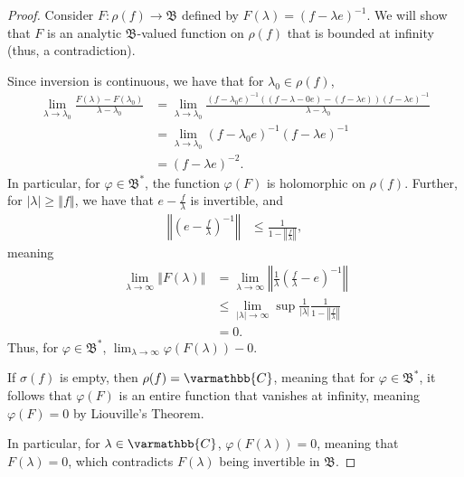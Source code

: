 \documentclass[10pt]{extarticle}
\newcommand{\C}{\mathbb{C}}
\newcommand{\norm}[1]{\left\Vert #1\right\Vert}
\theoremstyle{plain}
\theoremstyle{definition}
\theoremstyle{note}
\renewcommand*{\mathbb}[1]{\varmathbb{#1}}
\renewcommand{\newline}{\hfill\break}
\begin{document}
\begin{proof}
  Consider $F: \rho(f) \rightarrow \mathfrak{B}$ defined by $F(\lambda) = \left(f - \lambda e\right)^{-1}$. We will show that $F$ is an analytic $\mathfrak{B}$-valued function on $\rho(f)$ that is bounded at infinity (thus, a contradiction).\newline

  Since inversion is continuous, we have that for $\lambda_0 \in \rho(f)$,
  \begin{align*}
    \lim_{\lambda \rightarrow \lambda_0} \frac{F(\lambda) - F(\lambda_0)}{\lambda - \lambda_0} &= \lim_{\lambda \rightarrow \lambda_0}\frac{\left(f - \lambda_0 e\right)^{-1}\left((f - \lambda-0 e) - (f - \lambda e)\right)\left(f - \lambda e\right)^{-1}}{\lambda - \lambda_0}\\
                                                                                               &= \lim_{\lambda \rightarrow \lambda_0}\left(f - \lambda_0 e\right)^{-1}\left(f - \lambda e\right)^{-1}\\
                                 &= \left(f - \lambda e\right)^{-2}.
  \end{align*}
  In particular, for $\varphi \in \mathfrak{B}^{\ast}$, the function $\varphi(F)$ is holomorphic on $\rho(f)$. Further, for $|\lambda| \geq \norm{f}$, we have that $e - \frac{f}{\lambda}$ is invertible, and
  \begin{align*}
    \norm{\left(e - \frac{f}{\lambda}\right)^{-1}} &\leq \frac{1}{1 - \norm{\frac{f}{\lambda}}},
  \end{align*}
  meaning
  \begin{align*}
    \lim_{\lambda \rightarrow\infty}\norm{F(\lambda)} &= \lim_{\lambda \rightarrow\infty}\norm{\frac{1}{\lambda}\left(\frac{f}{\lambda} - e\right)^{-1}}\\
                                                      &\leq \lim_{|\lambda|\rightarrow\infty}\sup\frac{1}{|\lambda|} \frac{1}{1-\norm{\frac{f}{\lambda}}}\\
                                                      &= 0.
  \end{align*}
  Thus, for $\varphi \in \mathfrak{B}^{\ast}$, $\lim_{\lambda \rightarrow\infty}\varphi\left(F(\lambda)\right) - 0$.\newline

  If $\sigma(f)$ is empty, then $\rho(f) = \C$, meaning that for $\varphi \in \mathfrak{B}^{\ast}$, it follows that $\varphi(F)$ is an entire function that vanishes at infinity, meaning $\varphi(F) = 0$ by Liouville's Theorem.\newline

  In particular, for $\lambda \in \C$, $\varphi\left(F(\lambda)\right) = 0$, meaning that $F(\lambda) = 0$, which contradicts $F(\lambda)$ being invertible in $\mathfrak{B}$.
\end{proof}
\end{document}
